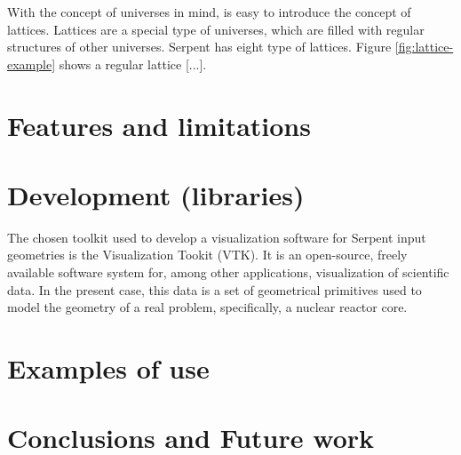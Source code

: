 \documentclass{elsarticle}
\begin{document}
With the concept of universes in mind, is easy to introduce the concept of 
lattices. Lattices are a special type of universes, which are filled with 
regular structures of other universes. Serpent has eight type of lattices. 
Figure \ref{fig:lattice-example} shows a regular lattice [...].




\section{Features and limitations}

\section{Development (libraries)}

The chosen toolkit used to develop a visualization software for Serpent input 
geometries is the Visualization Tookit (VTK)\cite{vtk}. It is an open-source, 
freely available software system for, among other applications, visualization of 
scientific data. In the present case, this data is a set of geometrical 
primitives used to model the geometry of a real problem, specifically, a 
nuclear reactor core.

\section{Examples of use}

\section{Conclusions and Future work}



\end{document}
